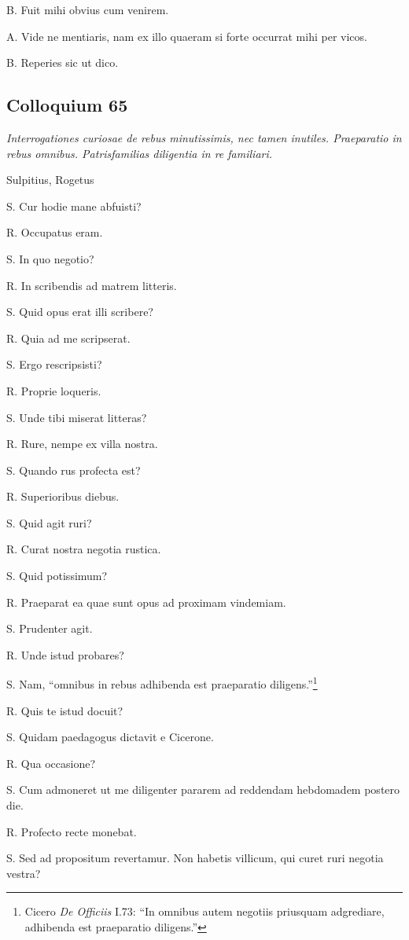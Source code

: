 \documentclass{article}
\begin{document}
B. Fuit mihi obvius cum venirem.

A. Vide ne mentiaris, nam ex illo quaeram si forte occurrat mihi per vicos.

B. Reperies sic ut dico.

\subsection{Colloquium 65}
\emph{Interrogationes curiosae de rebus minutissimis, nec tamen inutiles. Praeparatio in rebus omnibus. Patrisfamilias diligentia in re familiari.}

Sulpitius, Rogetus

S. Cur hodie mane abfuisti?

R. Occupatus eram.

S. In quo negotio?

R. In scribendis ad matrem litteris.

S. Quid opus erat illi scribere?

R. Quia ad me scripserat.

S. Ergo rescripsisti?

R. Proprie loqueris.

S. Unde tibi miserat litteras?

R. Rure, nempe ex villa nostra.

S. Quando rus profecta est?

R. Superioribus diebus.

S. Quid agit ruri?

R. Curat nostra negotia rustica.

S. Quid potissimum?

R. Praeparat ea quae sunt opus ad proximam vindemiam.

S. Prudenter agit.

R. Unde istud probares?

S. Nam, ``omnibus in rebus adhibenda est praeparatio diligens.''\footnote{Cicero \emph{De Officiis} I.73: ``In omnibus autem negotiis priusquam adgrediare, adhibenda est praeparatio diligens.''}

R. Quis te istud docuit?

S. Quidam paedagogus dictavit e Cicerone.

R. Qua occasione?

S. Cum admoneret ut me diligenter pararem ad reddendam hebdomadem postero die.

R. Profecto recte monebat.

S. Sed ad propositum revertamur. Non habetis villicum, qui curet ruri negotia vestra?
\end{document}
